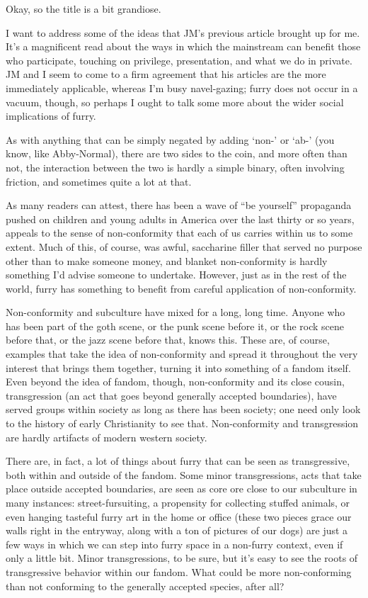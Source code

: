 
Okay, so the title is a bit grandiose.

I want to address some of the ideas that JM's previous article brought up for me. It's a magnificent read about the ways in which the mainstream can benefit those who participate, touching on privilege, presentation, and what we do in private. JM and I seem to come to a firm agreement that his articles are the more immediately applicable, whereas I'm busy navel-gazing; furry does not occur in a vacuum, though, so perhaps I ought to talk some more about the wider social implications of furry.

As with anything that can be simply negated by adding `non-' or `ab-' (you know, like Abby-Normal), there are two sides to the coin, and more often than not, the interaction between the two is hardly a simple binary, often involving friction, and sometimes quite a lot at that.

As many readers can attest, there has been a wave of ``be yourself'' propaganda pushed on children and young adults in America over the last thirty or so years, appeals to the sense of non-conformity that each of us carries within us to some extent. Much of this, of course, was awful, saccharine filler that served no purpose other than to make someone money, and blanket non-conformity is hardly something I'd advise someone to undertake. However, just as in the rest of the world, furry has something to benefit from careful application of non-conformity.

Non-conformity and subculture have mixed for a long, long time. Anyone who has been part of the goth scene, or the punk scene before it, or the rock scene before that, or the jazz scene before that, knows this. These are, of course, examples that take the idea of non-conformity and spread it throughout the very interest that brings them together, turning it into something of a fandom itself. Even beyond the idea of fandom, though, non-conformity and its close cousin, transgression (an act that goes beyond generally accepted boundaries), have served groups within society as long as there has been society; one need only look to the history of early Christianity to see that. Non-conformity and transgression are hardly artifacts of modern western society.

There are, in fact, a lot of things about furry that can be seen as transgressive, both within and outside of the fandom. Some minor transgressions, acts that take place outside accepted boundaries, are seen as core ore close to our subculture in many instances: street-fursuiting, a propensity for collecting stuffed animals, or even hanging tasteful furry art in the home or office (these two pieces grace our walls right in the entryway, along with a ton of pictures of our dogs) are just a few ways in which we can step into furry space in a non-furry context, even if only a little bit. Minor transgressions, to be sure, but it's easy to see the roots of transgressive behavior within our fandom. What could be more non-conforming than not conforming to the generally accepted species, after all?

